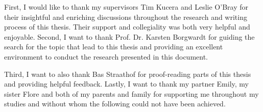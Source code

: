 First, I would like to thank my supervisors Tim Kucera and Leslie O'Bray for
their insightful and enriching discussions throughout the research and writing
process of this thesis. Their support and collegiality was both very helpful and
enjoyable. Second, I want to thank Prof. Dr. Karsten Borgwardt for guiding the
search for the topic that lead to this thesis and providing an excellent
environment to conduct the research presented in this document.

Third, I want to also thank Bas Straathof for proof-reading parts of this thesis
and providing helpful feedback. Lastly, I want to thank my partner Emily, my
sister Flore and both of my parents and family for supporting me throughout my
studies and without whom the following could not have been achieved.
